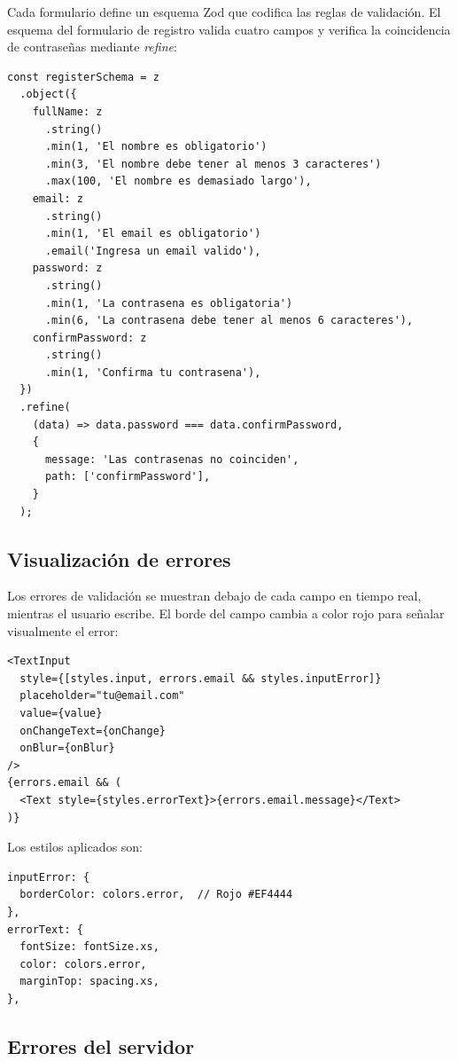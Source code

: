 Cada formulario define un esquema Zod que codifica las reglas de
validaci\'on. El esquema del formulario de registro valida cuatro campos
y verifica la coincidencia de contrase\~nas mediante \textit{refine}:

\begin{lstlisting}
const registerSchema = z
  .object({
    fullName: z
      .string()
      .min(1, 'El nombre es obligatorio')
      .min(3, 'El nombre debe tener al menos 3 caracteres')
      .max(100, 'El nombre es demasiado largo'),
    email: z
      .string()
      .min(1, 'El email es obligatorio')
      .email('Ingresa un email valido'),
    password: z
      .string()
      .min(1, 'La contrasena es obligatoria')
      .min(6, 'La contrasena debe tener al menos 6 caracteres'),
    confirmPassword: z
      .string()
      .min(1, 'Confirma tu contrasena'),
  })
  .refine(
    (data) => data.password === data.confirmPassword,
    {
      message: 'Las contrasenas no coinciden',
      path: ['confirmPassword'],
    }
  );
\end{lstlisting}

\subsection{Visualizaci\'on de errores}

Los errores de validaci\'on se muestran debajo de cada campo en tiempo real,
mientras el usuario escribe. El borde del campo cambia a color rojo para
se\~nalar visualmente el error:

\begin{lstlisting}
<TextInput
  style={[styles.input, errors.email && styles.inputError]}
  placeholder="tu@email.com"
  value={value}
  onChangeText={onChange}
  onBlur={onBlur}
/>
{errors.email && (
  <Text style={styles.errorText}>{errors.email.message}</Text>
)}
\end{lstlisting}

Los estilos aplicados son:

\begin{lstlisting}
inputError: {
  borderColor: colors.error,  // Rojo #EF4444
},
errorText: {
  fontSize: fontSize.xs,
  color: colors.error,
  marginTop: spacing.xs,
},
\end{lstlisting}

\subsection{Errores del servidor}

